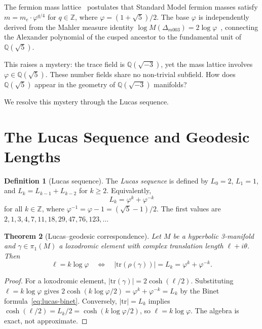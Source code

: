 \documentclass[12pt]{article}
\newtheorem{theorem}{Theorem}
\theoremstyle{definition}
\newtheorem{definition}[theorem]{Definition}
\newcommand{\Z}{\mathbb{Z}}
\newcommand{\Q}{\mathbb{Q}}
\newcommand{\ph}{\varphi}
\newcommand{\logph}{\log\ph}
\begin{document}
The fermion mass lattice~\cite{gentry-core} postulates that Standard
Model fermion masses satisfy $m = m_e \cdot \ph^{q/4}$ for $q \in \Z$,
where $\ph = (1+\sqrt{5})/2$. The base $\ph$ is independently derived
from the Mahler measure identity
$\log M(\Delta_{m003}) = 2\logph$~\cite{gentry-jktr}, connecting the
Alexander polynomial of the cusped ancestor to the fundamental unit of
$\Q(\sqrt{5})$.

This raises a mystery: the trace field is $\Q(\sqrt{-3})$, yet the
mass lattice involves $\ph \in \Q(\sqrt{5})$. These number fields share
no non-trivial subfield. How does $\Q(\sqrt{5})$ appear in the geometry
of $\Q(\sqrt{-3})$ manifolds?

We resolve this mystery through the Lucas sequence.

\section{The Lucas Sequence and Geodesic Lengths}

\begin{definition}[Lucas sequence]
The \emph{Lucas sequence} is defined by $L_0 = 2$, $L_1 = 1$, and
$L_k = L_{k-1} + L_{k-2}$ for $k \geq 2$. Equivalently,
\begin{equation}
  L_k = \ph^k + \ph^{-k}
  \label{eq:lucas-binet}
\end{equation}
for all $k \in \Z$, where $\ph^{-1} = \ph - 1 = ({\sqrt{5}-1})/{2}$.
The first values are $2, 1, 3, 4, 7, 11, 18, 29, 47, 76, 123, \ldots$
\end{definition}

\begin{theorem}[Lucas--geodesic correspondence]
\label{thm:lucas-geodesic}
Let $M$ be a hyperbolic 3-manifold and $\gamma \in \pi_1(M)$ a
loxodromic element with complex translation length $\ell + i\theta$.
Then
\begin{equation}
  \ell = k \logph
  \quad \Longleftrightarrow \quad
  |\mathrm{tr}(\rho(\gamma))| = L_k = \ph^k + \ph^{-k}.
  \label{eq:bridge}
\end{equation}
\end{theorem}

\begin{proof}
For a loxodromic element, $|\mathrm{tr}(\gamma)| = 2\cosh(\ell/2)$.
Substituting $\ell = k\logph$ gives
$2\cosh(k\logph/2) = \ph^k + \ph^{-k} = L_k$
by the Binet formula~\eqref{eq:lucas-binet}.
Conversely, $|\mathrm{tr}| = L_k$ implies $\cosh(\ell/2) = L_k/2
= \cosh(k\logph/2)$, so $\ell = k\logph$.
The algebra is exact, not approximate.
\end{proof}
\end{document}
